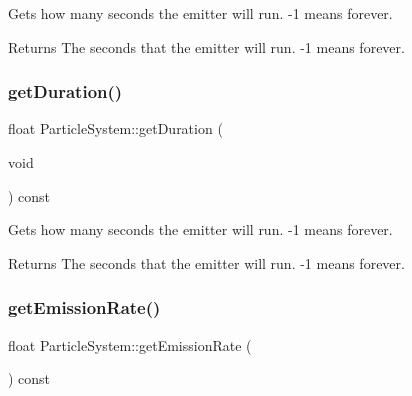 Gets how many seconds the emitter will run. -\/1 means \textquotesingle{}forever\textquotesingle{}.

\begin{DoxyReturn}{Returns}
The seconds that the emitter will run. -\/1 means \textquotesingle{}forever\textquotesingle{}. 
\end{DoxyReturn}
\mbox{\label{classParticleSystem_a6d8eb072c8670ee64381e6dbdb691070}} 
\subsubsection{\texorpdfstring{get\+Duration()}{getDuration()}\hspace{0.1cm}{\footnotesize\ttfamily [2/2]}}
{\footnotesize\ttfamily float Particle\+System\+::get\+Duration (\begin{DoxyParamCaption}\item[{void}]{ }\end{DoxyParamCaption}) const\hspace{0.3cm}{\ttfamily [inline]}}

Gets how many seconds the emitter will run. -\/1 means \textquotesingle{}forever\textquotesingle{}.

\begin{DoxyReturn}{Returns}
The seconds that the emitter will run. -\/1 means \textquotesingle{}forever\textquotesingle{}. 
\end{DoxyReturn}
\mbox{\label{classParticleSystem_af869c4ac393b207ffaf32a3f8f9de80e}} 
\subsubsection{\texorpdfstring{get\+Emission\+Rate()}{getEmissionRate()}\hspace{0.1cm}{\footnotesize\ttfamily [1/2]}}
{\footnotesize\ttfamily float Particle\+System\+::get\+Emission\+Rate (\begin{DoxyParamCaption}{ }\end{DoxyParamCaption}) const\hspace{0.3cm}{\ttfamily [inline]}}

